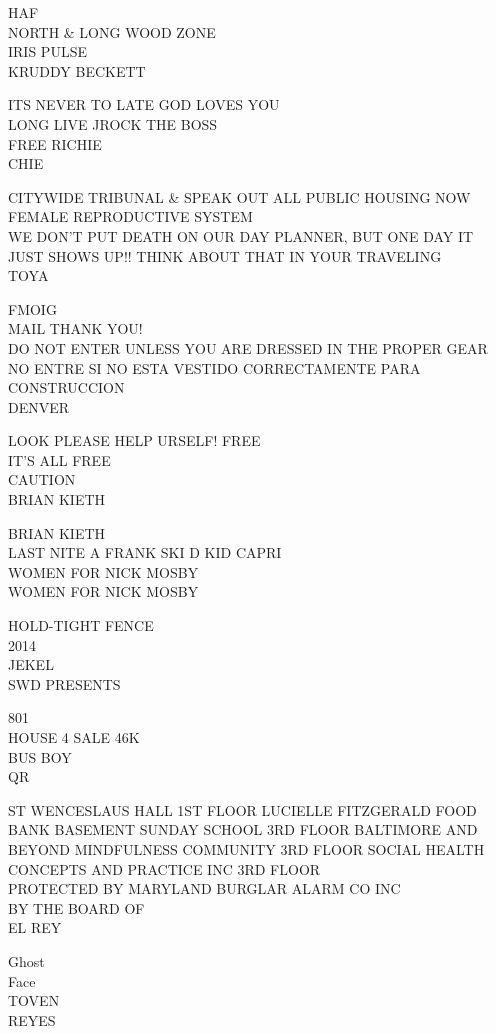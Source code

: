 \documentclass[10pt,letterpaper]{article}
\begin{document}
HAF\\
NORTH \& LONG WOOD ZONE\\
IRIS PULSE\\
KRUDDY BECKETT

ITS NEVER TO LATE GOD LOVES YOU\\
LONG LIVE JROCK THE BOSS\\
FREE RICHIE\\
CHIE

CITYWIDE TRIBUNAL \& SPEAK OUT ALL PUBLIC HOUSING NOW\\
FEMALE REPRODUCTIVE SYSTEM\\
WE DON'T PUT DEATH ON OUR DAY PLANNER, BUT ONE DAY IT JUST SHOWS UP!! THINK ABOUT THAT IN YOUR TRAVELING\\
TOYA

FMOIG\\
MAIL THANK YOU!\\
DO NOT ENTER UNLESS YOU ARE DRESSED IN THE PROPER GEAR NO ENTRE SI NO ESTA VESTIDO CORRECTAMENTE PARA CONSTRUCCION\\
DENVER

LOOK PLEASE HELP URSELF!  FREE\\
IT'S ALL FREE\\
CAUTION\\
BRIAN KIETH

BRIAN KIETH\\
LAST NITE A FRANK SKI D KID CAPRI\\
WOMEN FOR NICK MOSBY\\
WOMEN FOR NICK MOSBY

HOLD{-}TIGHT FENCE\\
2014\\
JEKEL\\
SWD PRESENTS

801\\
HOUSE 4 SALE 46K\\
BUS BOY\\
QR

ST WENCESLAUS HALL 1ST FLOOR LUCIELLE FITZGERALD FOOD BANK BASEMENT SUNDAY SCHOOL 3RD FLOOR BALTIMORE AND BEYOND MINDFULNESS COMMUNITY 3RD FLOOR SOCIAL HEALTH CONCEPTS AND PRACTICE INC 3RD FLOOR\\
PROTECTED BY MARYLAND BURGLAR ALARM CO INC\\
BY THE BOARD OF\\
EL REY

Ghost\\
Face\\
TOVEN\\
REYES
\end{document}
